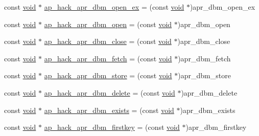 \begin{DoxyCompactItemize}
\item 
const \hyperlink{group__MOD__ISAPI_gacd6cdbf73df3d9eed42fa493d9b621a6}{void} $\ast$ \hyperlink{srclib_2apr-util_2exports_8c_ad5e65928e805307c23d6c9d3efa573ef}{ap\+\_\+hack\+\_\+apr\+\_\+dbm\+\_\+open\+\_\+ex} = (const \hyperlink{group__MOD__ISAPI_gacd6cdbf73df3d9eed42fa493d9b621a6}{void} $\ast$)apr\+\_\+dbm\+\_\+open\+\_\+ex
\item 
const \hyperlink{group__MOD__ISAPI_gacd6cdbf73df3d9eed42fa493d9b621a6}{void} $\ast$ \hyperlink{srclib_2apr-util_2exports_8c_ae61ecc17be9a77136f3555d0f3e666b3}{ap\+\_\+hack\+\_\+apr\+\_\+dbm\+\_\+open} = (const \hyperlink{group__MOD__ISAPI_gacd6cdbf73df3d9eed42fa493d9b621a6}{void} $\ast$)apr\+\_\+dbm\+\_\+open
\item 
const \hyperlink{group__MOD__ISAPI_gacd6cdbf73df3d9eed42fa493d9b621a6}{void} $\ast$ \hyperlink{srclib_2apr-util_2exports_8c_a8052eeea8035d898e7606b18ed391dc7}{ap\+\_\+hack\+\_\+apr\+\_\+dbm\+\_\+close} = (const \hyperlink{group__MOD__ISAPI_gacd6cdbf73df3d9eed42fa493d9b621a6}{void} $\ast$)apr\+\_\+dbm\+\_\+close
\item 
const \hyperlink{group__MOD__ISAPI_gacd6cdbf73df3d9eed42fa493d9b621a6}{void} $\ast$ \hyperlink{srclib_2apr-util_2exports_8c_acac7b948294a4140044b1390c25e1f81}{ap\+\_\+hack\+\_\+apr\+\_\+dbm\+\_\+fetch} = (const \hyperlink{group__MOD__ISAPI_gacd6cdbf73df3d9eed42fa493d9b621a6}{void} $\ast$)apr\+\_\+dbm\+\_\+fetch
\item 
const \hyperlink{group__MOD__ISAPI_gacd6cdbf73df3d9eed42fa493d9b621a6}{void} $\ast$ \hyperlink{srclib_2apr-util_2exports_8c_aa1420f8cd045350521e1bdf670a00648}{ap\+\_\+hack\+\_\+apr\+\_\+dbm\+\_\+store} = (const \hyperlink{group__MOD__ISAPI_gacd6cdbf73df3d9eed42fa493d9b621a6}{void} $\ast$)apr\+\_\+dbm\+\_\+store
\item 
const \hyperlink{group__MOD__ISAPI_gacd6cdbf73df3d9eed42fa493d9b621a6}{void} $\ast$ \hyperlink{srclib_2apr-util_2exports_8c_ac90725c1c42116a01b0563c749715d07}{ap\+\_\+hack\+\_\+apr\+\_\+dbm\+\_\+delete} = (const \hyperlink{group__MOD__ISAPI_gacd6cdbf73df3d9eed42fa493d9b621a6}{void} $\ast$)apr\+\_\+dbm\+\_\+delete
\item 
const \hyperlink{group__MOD__ISAPI_gacd6cdbf73df3d9eed42fa493d9b621a6}{void} $\ast$ \hyperlink{srclib_2apr-util_2exports_8c_a1819be44907d0ebfe8e4aeaf03a54884}{ap\+\_\+hack\+\_\+apr\+\_\+dbm\+\_\+exists} = (const \hyperlink{group__MOD__ISAPI_gacd6cdbf73df3d9eed42fa493d9b621a6}{void} $\ast$)apr\+\_\+dbm\+\_\+exists
\item 
const \hyperlink{group__MOD__ISAPI_gacd6cdbf73df3d9eed42fa493d9b621a6}{void} $\ast$ \hyperlink{srclib_2apr-util_2exports_8c_a44364c7e95ab52ad507db837dfc97752}{ap\+\_\+hack\+\_\+apr\+\_\+dbm\+\_\+firstkey} = (const \hyperlink{group__MOD__ISAPI_gacd6cdbf73df3d9eed42fa493d9b621a6}{void} $\ast$)apr\+\_\+dbm\+\_\+firstkey

\end{DoxyCompactItemize}
